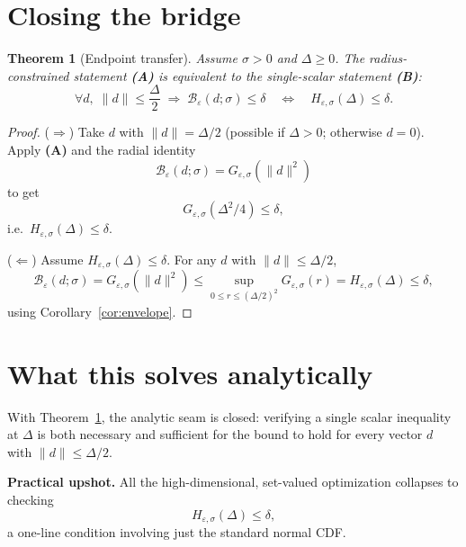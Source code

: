 \documentclass[11pt]{article}
\newcommand{\Beps}{\mathcal{B}_\varepsilon}
\newtheorem{theorem}{Theorem}
\begin{document}
\section{Closing the bridge}

\begin{theorem}[Endpoint transfer]\label{thm:bridge}
Assume $\sigma>0$ and $\Delta\ge0$.
The radius-constrained statement \textbf{(A)} is equivalent to the
single-scalar statement \textbf{(B)}:
\[
\forall d,\;\|d\|\le\frac{\Delta}{2}\;\Longrightarrow\;
\Beps(d;\sigma)\le\delta
\quad\Longleftrightarrow\quad
H_{\varepsilon,\sigma}(\Delta)\le\delta.
\]
\end{theorem}

\begin{proof}
($\Rightarrow$)
Take $d$ with $\|d\|=\Delta/2$ (possible if $\Delta>0$; otherwise $d=0$).
Apply \textbf{(A)} and the radial identity
\[
\Beps(d;\sigma)=G_{\varepsilon,\sigma}(\|d\|^2)
\]
to get
\[
G_{\varepsilon,\sigma}(\Delta^2/4)\le\delta,
\]
i.e.\ $H_{\varepsilon,\sigma}(\Delta)\le\delta$.

($\Leftarrow$)
Assume $H_{\varepsilon,\sigma}(\Delta)\le\delta$.
For any $d$ with $\|d\|\le\Delta/2$,
\[
\Beps(d;\sigma)=G_{\varepsilon,\sigma}(\|d\|^2)
\le
\sup_{0\le r\le(\Delta/2)^2}G_{\varepsilon,\sigma}(r)
=H_{\varepsilon,\sigma}(\Delta)
\le\delta,
\]
using Corollary~\ref{cor:envelope}.
\end{proof}

\section{What this solves analytically}
With Theorem~\ref{thm:bridge}, the analytic seam is closed: verifying a
single scalar inequality at $\Delta$ is both necessary and sufficient for the
bound to hold for every vector $d$ with $\|d\|\le\Delta/2$.

\medskip\noindent
\textbf{Practical upshot.}
All the high-dimensional, set-valued optimization collapses to checking
\[
H_{\varepsilon,\sigma}(\Delta)\le\delta,
\]
a one-line condition involving just the standard normal CDF.
\end{document}
